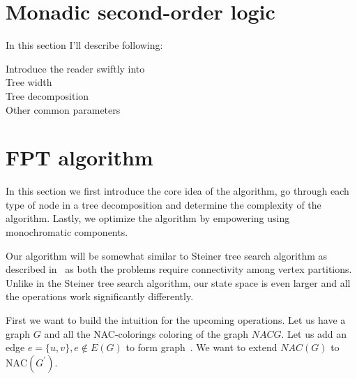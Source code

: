 
\section{Monadic second-order logic}

In this section I'll describe following:

\begin{description}
	\item[Introduce the reader swiftly into~\MSO{}]
	\item[Tree width]
	\item[Tree decomposition]
	\item[Other common parameters]
\end{description}

\section{FPT algorithm}

In this section we first introduce the core idea of the algorithm,
go through each type of node in a tree decomposition and
determine the complexity of the algorithm.
Lastly, we optimize the algorithm by empowering using monochromatic components.

Our algorithm will be somewhat similar to Steiner tree search algorithm
as described in~\cite{book_parametrized_algorithms} as both the problems require connectivity
among vertex partitions. Unlike in the Steiner tree search algorithm,
our state space is even larger and all the operations work significantly differently.

First we want to build the intuition for the upcoming operations.
Let us have a graph \( G \) and all the NAC-colorings coloring of the graph
\( NACG \). Let us add an edge \( e = \{u, v\}, e \not\in E(G) \) to form graph~\Gprime.
We want to extend \( NAC(G) \) to \( \text{NAC} (G^\prime) \).

